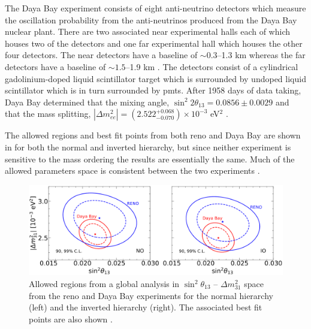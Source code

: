 The Daya Bay experiment consists of eight anti-neutrino detectors which measure the oscillation probability from the anti-neutrinos produced from the Daya Bay nuclear plant. There are two associated near experimental halls each of which houses two of the detectors and one far experimental hall which houses the other four detectors. The near detectors have a baseline of $\sim0.3$--1.3 km whereas the far detectors have a baseline of $\sim1.5$--1.9 km \cite{2020_global_reassessment_of_the_neutrino_oscillation_picture}. The detectors consist of a cylindrical gadolinium-doped liquid scintillator target which is surrounded by undoped liquid scintillator which is in turn surrounded by \glspl{pmt}. After 1958 days of data taking, Daya Bay determined that the mixing angle, $\sin^2{2\theta_{13}} = 0.0856 \pm 0.0029$ and that the mass splitting, $|\Delta m^2_{ee}| = (2.522^{+0.068}_{-0.070}) \times 10^{-3}$ eV$^2$ \cite{Measurement_of_electron_antineutrino_oscillation_with_1958_days_of_operation_at_Daya_Bay}.

The allowed regions and best fit points from both \gls{reno} and Daya Bay are shown in  for both the normal and inverted hierarchy, but since neither experiment is sensitive to the mass ordering the results are essentially the same. Much of the allowed parameters space is consistent between the two experiments \cite{2020_global_reassessment_of_the_neutrino_oscillation_picture}.

\begin{figure}
    \centering
    \includegraphics[width = \largefigwidth]{figures-chap2/theta_13.png}
    \caption[Allowed regions in $\sin^2{\theta_{13}}$ -- $\Delta m^2_{31}$ space from the \gls{reno} and Daya Bay experiments.]{Allowed regions from a global analysis in $\sin^2{\theta_{13}}$ -- $\Delta m^2_{31}$ space from the \gls{reno} and Daya Bay experiments for the normal hierarchy (left) and the inverted hierarchy (right). The associated best fit points are also shown
    \cite{2020_global_reassessment_of_the_neutrino_oscillation_picture}.}
    \label{fig:Reno_Daya_Bay}
\end{figure}

